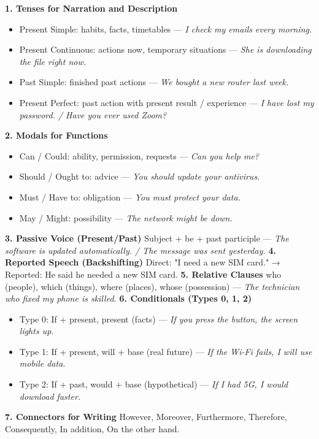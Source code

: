 \documentclass[11pt]{article}
\newcommand{\cle}[1]{{\popxbold\color{popdark}#1}}
\begin{document}
\begin{methode}
\textbf{1. Tenses for Narration and Description}
\begin{itemize}
    \item \cle{Present Simple:} habits, facts, timetables — \emph{I check my emails every morning.}
    \item \cle{Present Continuous:} actions now, temporary situations — \emph{She is downloading the file right now.}
    \item \cle{Past Simple:} finished past actions — \emph{We bought a new router last week.}
    \item \cle{Present Perfect:} past action with present result / experience — \emph{I have lost my password. / Have you ever used Zoom?}
\end{itemize}
\textbf{2. Modals for Functions}
\begin{itemize}
    \item \cle{Can / Could:} ability, permission, requests — \emph{Can you help me?}
    \item \cle{Should / Ought to:} advice — \emph{You should update your antivirus.}
    \item \cle{Must / Have to:} obligation — \emph{You must protect your data.}
    \item \cle{May / Might:} possibility — \emph{The network might be down.}
\end{itemize}
\textbf{3. Passive Voice (Present/Past)}
\cle{Subject + be + past participle} — \emph{The software is updated automatically. / The message was sent yesterday.}
\textbf{4. Reported Speech (Backshifting)}
\cle{Direct: "I need a new SIM card." → Reported: He said he needed a new SIM card.}
\textbf{5. Relative Clauses}
\cle{who (people), which (things), where (places), whose (possession)} — \emph{The technician who fixed my phone is skilled.}
\textbf{6. Conditionals (Types 0, 1, 2)}
\begin{itemize}
    \item Type 0: \cle{If + present, present} (facts) — \emph{If you press the button, the screen lights up.}
    \item Type 1: \cle{If + present, will + base} (real future) — \emph{If the Wi-Fi fails, I will use mobile data.}
    \item Type 2: \cle{If + past, would + base} (hypothetical) — \emph{If I had 5G, I would download faster.}
\end{itemize}
\textbf{7. Connectors for Writing}
\cle{However, Moreover, Furthermore, Therefore, Consequently, In addition, On the other hand.}
\end{methode}
\end{document}
